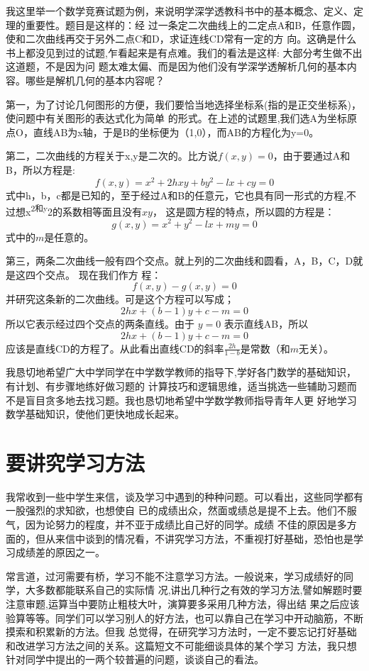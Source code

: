\documentclass[twoside,openright,headings=optiontohead]{ctexbook} %
\begin{document}
{我这里举一个数学竞赛试题为例，来说明学深学透教科书中的基本概念、定义、定理的重要性。题目是这样的：经
过一条定二次曲线上的二定点A和B，任意作圆，使和二次曲线再交于另外二点C和D，求证连线CD常有一定的方
向。这确是什么书上都没见到过的试题,乍看起来是有点难。我们的看法是这样: 大部分考生做不出这道题，不是因为问
题太难太偏、而是因为他们没有学深学透解析几何的基本内容。哪些是解机几何的基本内容呢？

第一，为了讨论几何图形的方便，我们要恰当地选择坐标系(指的是正交坐标系)，使问题中有关图形的表达式化为简单
的形式。在上述的试题里,我们选A为坐标原点O，直线AB为x轴，于是B的坐标便为（1,0），而AB的方程化为y=0。

第二，二次曲线的方程关于x,y是二次的。比方说\(f(x, y)=0\)，由于要通过A和B，所以方程是:
\[f(x, y)=x^2+2hxy+ by^2-lx+ cy = 0\]
式中h，b，c都是已知的，至于经过A和B的任意元，它也具有同一形式的方程,不过想x\textsuperscript{2和y}2的系数相等面且没有\(xy\)，
这是圆方程的特点，所以圆的方程是：
\[g(x,y)=x^2+y^2-lx+my=0\]
式中的\(m\)是任意的。

第三，两条二次曲线一般有四个交点。就上列的二次曲线和圆看，A，B，C，D就是这四个交点。 现在我们作方
程：
\[f(x,y) - g(x,y)=0\]
并研究这条新的二次曲线。可是这个方程可以写成；
\[2hx+(b-1)y+c-m=0\]
所以它表示经过四个交点的两条直线。由于 \(y=0\) 表示直线AB，所以
\[2hx+(b-1)y+c-m=0\]
应该是直线CD的方程了。从此看出直线CD的斜率\(\frac{2h}{1-b}\)是常数（和\(m\)无关）。

我恳切地希望广大中学同学在中学数学教师的指导下,学好各门数学的基础知识，有计划、有步骤地练好做习题的
计算技巧和逻辑思维，适当挑选一些辅助习题而不是盲目贪多地去找习题。我也恳切地希望中学数学教师指导青年人更
好地学习数学基础知识，使他们更快地成长起来。

\hypertarget{ux8981ux8bb2ux7a76ux5b66ux4e60ux65b9ux6cd5}{%
\chapter*{要讲究学习方法}\label{ux8981ux8bb2ux7a76ux5b66ux4e60ux65b9ux6cd5}}

我常收到一些中学生来信，谈及学习中遇到的种种问题。可以看出，这些同学都有一股强烈的求知欲，也想使自
已的成绩出众，然面或绩总是提不上去。他们不服气，因为论努力的程度，并不亚于成绩比自己好的同学。成绩
不佳的原因是多方面的，但从来信中谈到的情况看，不讲究学习方法，不重视打好基础，恐怕也是学习成绩差的原因之一。

常言道，过河需要有桥，学习不能不注意学习方法。一般说来，学习成绩好的同学，大多数都能联系自己的实际情
况,讲出几种行之有效的学习方法,譬如解题时要注意审题,运算当中要防止粗枝大叶，演算要多采用几种方法，得出结
果之后应该验算等等。同学们可以学习别人的好方法，也可以靠自己在学习中开动脑筋，不断摸索和积累新的方法。但我
总觉得，在研究学习方法时，一定不要忘记打好基础和改进学习方法之间的关系。这篇短文不可能细谈具体的某个学习
方法，我只想针对同学中提出的一两个较普遍的问题，谈谈自己的看法。

}
\end{document}
